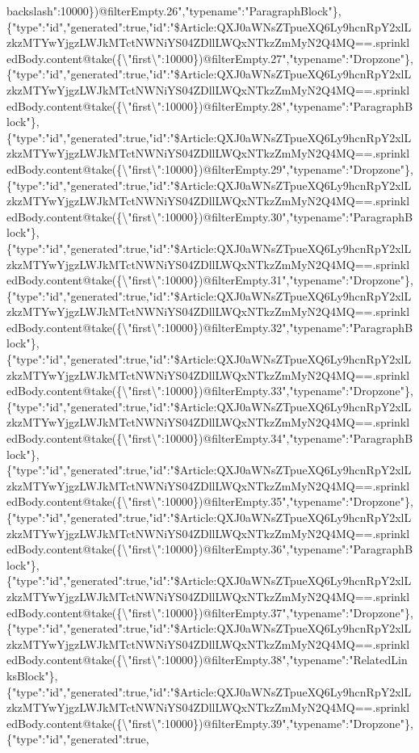 backslash{}":10000\})@filterEmpty.26","typename":"ParagraphBlock"\},\{"type":"id","generated":true,"id":"\$Article:QXJ0aWNsZTpueXQ6Ly9hcnRpY2xlLzkzMTYwYjgzLWJkMTctNWNiYS04ZDllLWQxNTkzZmMyN2Q4MQ==.sprinkledBody.content@take(\{\textbackslash{}"first\textbackslash{}":10000\})@filterEmpty.27","typename":"Dropzone"\},\{"type":"id","generated":true,"id":"\$Article:QXJ0aWNsZTpueXQ6Ly9hcnRpY2xlLzkzMTYwYjgzLWJkMTctNWNiYS04ZDllLWQxNTkzZmMyN2Q4MQ==.sprinkledBody.content@take(\{\textbackslash{}"first\textbackslash{}":10000\})@filterEmpty.28","typename":"ParagraphBlock"\},\{"type":"id","generated":true,"id":"\$Article:QXJ0aWNsZTpueXQ6Ly9hcnRpY2xlLzkzMTYwYjgzLWJkMTctNWNiYS04ZDllLWQxNTkzZmMyN2Q4MQ==.sprinkledBody.content@take(\{\textbackslash{}"first\textbackslash{}":10000\})@filterEmpty.29","typename":"Dropzone"\},\{"type":"id","generated":true,"id":"\$Article:QXJ0aWNsZTpueXQ6Ly9hcnRpY2xlLzkzMTYwYjgzLWJkMTctNWNiYS04ZDllLWQxNTkzZmMyN2Q4MQ==.sprinkledBody.content@take(\{\textbackslash{}"first\textbackslash{}":10000\})@filterEmpty.30","typename":"ParagraphBlock"\},\{"type":"id","generated":true,"id":"\$Article:QXJ0aWNsZTpueXQ6Ly9hcnRpY2xlLzkzMTYwYjgzLWJkMTctNWNiYS04ZDllLWQxNTkzZmMyN2Q4MQ==.sprinkledBody.content@take(\{\textbackslash{}"first\textbackslash{}":10000\})@filterEmpty.31","typename":"Dropzone"\},\{"type":"id","generated":true,"id":"\$Article:QXJ0aWNsZTpueXQ6Ly9hcnRpY2xlLzkzMTYwYjgzLWJkMTctNWNiYS04ZDllLWQxNTkzZmMyN2Q4MQ==.sprinkledBody.content@take(\{\textbackslash{}"first\textbackslash{}":10000\})@filterEmpty.32","typename":"ParagraphBlock"\},\{"type":"id","generated":true,"id":"\$Article:QXJ0aWNsZTpueXQ6Ly9hcnRpY2xlLzkzMTYwYjgzLWJkMTctNWNiYS04ZDllLWQxNTkzZmMyN2Q4MQ==.sprinkledBody.content@take(\{\textbackslash{}"first\textbackslash{}":10000\})@filterEmpty.33","typename":"Dropzone"\},\{"type":"id","generated":true,"id":"\$Article:QXJ0aWNsZTpueXQ6Ly9hcnRpY2xlLzkzMTYwYjgzLWJkMTctNWNiYS04ZDllLWQxNTkzZmMyN2Q4MQ==.sprinkledBody.content@take(\{\textbackslash{}"first\textbackslash{}":10000\})@filterEmpty.34","typename":"ParagraphBlock"\},\{"type":"id","generated":true,"id":"\$Article:QXJ0aWNsZTpueXQ6Ly9hcnRpY2xlLzkzMTYwYjgzLWJkMTctNWNiYS04ZDllLWQxNTkzZmMyN2Q4MQ==.sprinkledBody.content@take(\{\textbackslash{}"first\textbackslash{}":10000\})@filterEmpty.35","typename":"Dropzone"\},\{"type":"id","generated":true,"id":"\$Article:QXJ0aWNsZTpueXQ6Ly9hcnRpY2xlLzkzMTYwYjgzLWJkMTctNWNiYS04ZDllLWQxNTkzZmMyN2Q4MQ==.sprinkledBody.content@take(\{\textbackslash{}"first\textbackslash{}":10000\})@filterEmpty.36","typename":"ParagraphBlock"\},\{"type":"id","generated":true,"id":"\$Article:QXJ0aWNsZTpueXQ6Ly9hcnRpY2xlLzkzMTYwYjgzLWJkMTctNWNiYS04ZDllLWQxNTkzZmMyN2Q4MQ==.sprinkledBody.content@take(\{\textbackslash{}"first\textbackslash{}":10000\})@filterEmpty.37","typename":"Dropzone"\},\{"type":"id","generated":true,"id":"\$Article:QXJ0aWNsZTpueXQ6Ly9hcnRpY2xlLzkzMTYwYjgzLWJkMTctNWNiYS04ZDllLWQxNTkzZmMyN2Q4MQ==.sprinkledBody.content@take(\{\textbackslash{}"first\textbackslash{}":10000\})@filterEmpty.38","typename":"RelatedLinksBlock"\},\{"type":"id","generated":true,"id":"\$Article:QXJ0aWNsZTpueXQ6Ly9hcnRpY2xlLzkzMTYwYjgzLWJkMTctNWNiYS04ZDllLWQxNTkzZmMyN2Q4MQ==.sprinkledBody.content@take(\{\textbackslash{}"first\textbackslash{}":10000\})@filterEmpty.39","typename":"Dropzone"\},\{"type":"id","generated":true,